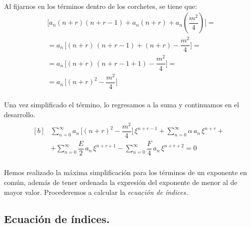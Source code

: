 \\
Al fijarnos en los términos dentro de los corchetes, se tiene que:
\begin{align*}
&{} \bigg[ a_{n} (n {+} r) (n {+} r {-} 1) {+} a_{n} (n {+} r) {+} a_{n} \left( \dfrac{m^{2}}{4} \right) \bigg] = \\[0.5em] 
&= a_{n} \, \bigg[  (n {+} r) \, (n {+} r {-} 1) {+} (n {+} r) {-} \dfrac{m^{2}}{4} \bigg] = \\[0.5em]
&= a_{n} \, \bigg[  (n {+} r) \, (n {+} r {-} 1 {+} {1}) {-} \dfrac{m^{2}}{4} \bigg] = \\[0.5em]
&= a_{n} \, \bigg[ (n {+} r)^{2} {-} \dfrac{m^{2}}{4} \bigg]
\end{align*}
\\
Una vez simplificado el término, lo regresamos a la suma y continuamos en el desarrollo.
\begin{align}
\begin{aligned}[b]
&{} \sum_{n=0}^{\infty} a_{n} \, \bigg[ (n {+} r)^{2} {-} \dfrac{m^{2}}{4} \bigg] \, \xi^{n+r-1} + \sum_{n=0}^{\infty} \alpha \, a_{n} \, \xi^{n+r} + \\[1em] 
&+ \sum_{n=0}^{\infty} \dfrac{E}{2} \, a_{n} \, \xi^{n+r+1} - \sum_{n=0}^{\infty} \dfrac{F}{4} \, a_{n} \, \xi^{n+r+2} = 0 
\end{aligned}
\label{eq:ecuacion_reducida}
\end{align}
\\
Hemos realizado la máxima simplificación para los términos de un exponente en común, además de tener ordenada la expresión del exponente de menor al de mayor valor. Procederemos a calcular la \emph{ecuación de índices.}

\subsection{Ecuación de índices.}

